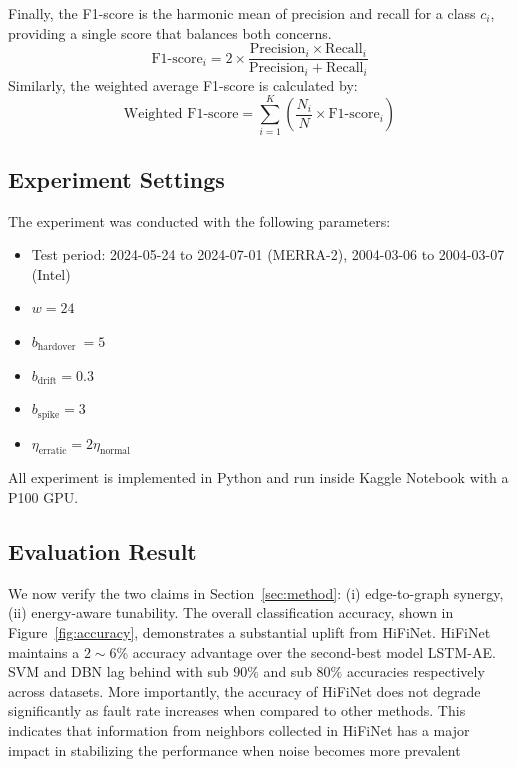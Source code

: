 Finally, the F1-score is the harmonic mean of precision and recall for a class \(c_i\), providing a single score that balances both concerns.
\begin{equation}
  \text{F1-score}_i = 2 \times \frac{\text{Precision}_i \times \text{Recall}_i}{\text{Precision}_i + \text{Recall}_i}
\end{equation}
Similarly, the weighted average F1-score is calculated by:
\begin{equation}
  \text{Weighted F1-score} = \sum_{i=1}^{K} \left( \frac{N_i}{N} \times \text{F1-score}_i \right)
\end{equation}

\subsection{Experiment Settings}
The experiment was conducted with the following parameters:
\begin{itemize}
  \item Test period: 2024-05-24 to 2024-07-01 (MERRA-2), 2004-03-06 to 2004-03-07 (Intel)
  \item \(w = 24\)
  \item \(b_\text{hardover}\ = 5\)
  \item \(b_\text{drift} = 0.3\)
  \item \(b_\text{spike} = 3\)
  \item \(\eta_\text{erratic} = 2\eta_\text{normal}\)
\end{itemize}

All experiment is implemented in Python and run inside Kaggle Notebook with a P100 GPU.

\subsection{Evaluation Result}
We now verify the two claims in Section~\ref{sec:method}: (i) edge-to-graph synergy, (ii) energy-aware tunability. The overall classification accuracy, shown in Figure~\ref{fig:accuracy}, demonstrates a substantial uplift from HiFiNet. HiFiNet maintains a \(2\sim6\%\) accuracy advantage over the second-best model LSTM-AE. SVM and DBN lag behind with sub \(90\%\) and sub \(80\%\) accuracies respectively across datasets. More importantly, the accuracy of HiFiNet does not degrade significantly as fault rate increases when compared to other methods. This indicates that information from neighbors collected in HiFiNet has a major impact in stabilizing the performance when noise becomes more prevalent

